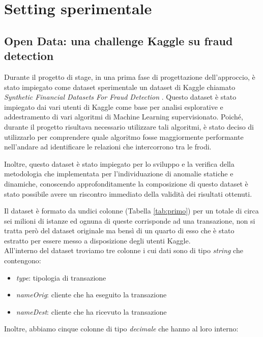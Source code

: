 \chapter{Setting sperimentale}
\section{Open Data: una challenge Kaggle su fraud detection}


Durante il progetto di stage, in una prima fase di progettazione dell’approccio, è stato impiegato come dataset sperimentale un dataset di Kaggle chiamato \textit{Synthetic Financial Datasets For Fraud Detection} \citep{challenge}.
Questo dataset è stato impiegato dai vari utenti di Kaggle come base per analisi esplorative e addestramento di vari algoritmi di Machine Learning supervisionato. Poiché, durante il  progetto risultava necessario utilizzare tali algoritmi, è stato deciso di utilizzarlo per comprendere quale algoritmo fosse maggiormente performante nell'andare ad identificare le relazioni che intercorrono tra le frodi.

Inoltre, questo dataset è stato impiegato per lo sviluppo e la verifica della metodologia che  implementata per l'individuazione di anomalie statiche e dinamiche, conoscendo approfonditamente la composizione di questo dataset è stato possibile avere un riscontro immediato della validità dei risultati ottenuti.

Il dataset è formato da undici colonne (Tabella \ref{tab:primo}) per un totale di circa sei milioni di istanze ed ognuna di queste corrisponde ad una transazione, non si tratta però del dataset originale ma bensì di un quarto di esso che è stato estratto per essere messo a disposizione degli utenti Kaggle. \\




\noindent All'interno del dataset troviamo tre colonne i cui dati sono di tipo \textit{string} che contengono: 
\begin{itemize}
\item \textit{type}: tipologia di transazione
\item \textit{nameOrig}: cliente che ha eseguito la transazione
\item \textit{nameDest}: cliente che ha ricevuto la transazione
\end{itemize}

\noindent Inoltre, abbiamo cinque colonne di tipo \textit{decimale} che hanno al loro interno:

